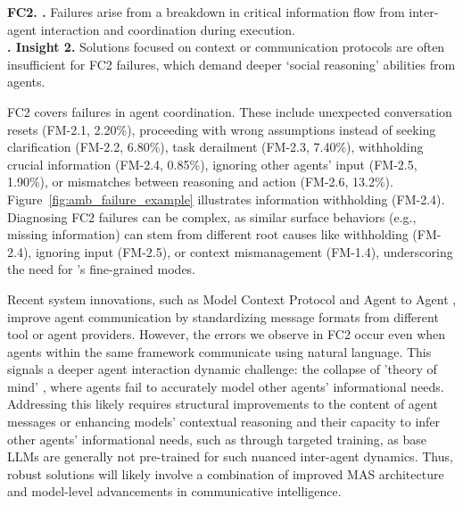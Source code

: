 
\begin{tcolorbox}[colback=berkeleyblue!5!white, colframe=berkeleyblue!100!black, boxrule=0.5mm, left=0.1mm, right=0.1mm, top=0.1mm, bottom=0.1mm]
\textbf{FC2. \fcII.} Failures arise from a breakdown in critical information flow from inter-agent interaction and coordination during execution. \\
\textbf{\faLightbulbO. Insight 2.} Solutions focused on context or communication protocols are often insufficient for FC2 failures, which demand deeper `social reasoning' abilities from agents.
\end{tcolorbox}

FC2 covers failures in agent coordination. These include unexpected conversation resets (FM-2.1, 2.20\%), proceeding with wrong assumptions instead of seeking clarification (FM-2.2, 6.80\%), task derailment (FM-2.3, 7.40\%), withholding crucial information (FM-2.4, 0.85\%), ignoring other agents' input (FM-2.5, 1.90\%), or mismatches between reasoning and action (FM-2.6, 13.2\%). Figure~\ref{fig:amb_failure_example} illustrates information withholding (FM-2.4). Diagnosing FC2 failures can be complex, as similar surface behaviors (e.g., missing information) can stem from different root causes like withholding (FM-2.4), ignoring input (FM-2.5), or context mismanagement (FM-1.4), underscoring the need for \taxonomy{}'s fine-grained modes.


Recent system innovations, such as Model Context Protocol \cite{MCPIntroduction2024} and Agent to Agent \cite{Surapaneni2025A2A}, improve agent communication by standardizing message formats from different tool or agent providers. However, the errors we observe in FC2 occur even when agents within the same framework communicate using natural language. This signals a deeper agent interaction dynamic challenge: the collapse of 'theory of mind' \cite{agashe2025llmcoordinationevaluatinganalyzingmultiagent}, where agents fail to accurately model other agents' informational needs. Addressing this likely requires structural improvements to the content of agent messages or enhancing models' contextual reasoning and their capacity to infer other agents' informational needs, such as through targeted training, as base LLMs are generally not pre-trained for such nuanced inter-agent dynamics. Thus, robust solutions will likely involve a combination of improved MAS architecture and model-level advancements in communicative intelligence.


